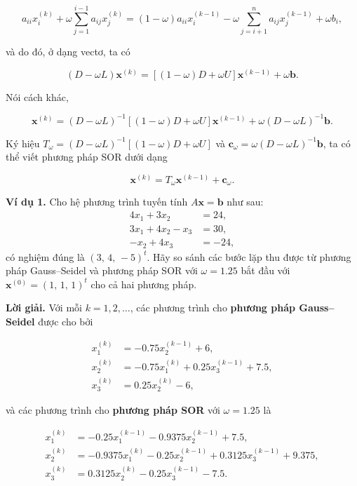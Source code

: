 \[
a_{ii}x_i^{(k)} + \omega \sum_{j=1}^{i-1} a_{ij}x_j^{(k)} 
= (1 - \omega)a_{ii}x_i^{(k-1)} - \omega \sum_{j=i+1}^{n} a_{ij}x_j^{(k-1)} + \omega b_i,
\]

và do đó, ở dạng vectơ, ta có

\[
(D - \omega L)\mathbf{x}^{(k)} = [(1 - \omega)D + \omega U]\mathbf{x}^{(k-1)} + \omega \mathbf{b}.
\]

Nói cách khác,

\[
\mathbf{x}^{(k)} = (D - \omega L)^{-1}[(1 - \omega)D + \omega U]\mathbf{x}^{(k-1)} + \omega (D - \omega L)^{-1}\mathbf{b}. \tag{7.18}
\]

Ký hiệu \( T_\omega = (D - \omega L)^{-1}[(1 - \omega)D + \omega U] \) và 
\( \mathbf{c}_\omega = \omega (D - \omega L)^{-1}\mathbf{b} \), 
ta có thể viết phương pháp SOR dưới dạng

\[
\mathbf{x}^{(k)} = T_\omega \mathbf{x}^{(k-1)} + \mathbf{c}_\omega. \tag{7.19}
\]

\textbf{Ví dụ 1.}  
Cho hệ phương trình tuyến tính \( A\mathbf{x} = \mathbf{b} \) như sau:
\[
\begin{aligned}
4x_1 + 3x_2 &= 24, \\
3x_1 + 4x_2 - x_3 &= 30, \\
- x_2 + 4x_3 &= -24,
\end{aligned}
\]
có nghiệm đúng là \( (3,\, 4,\, -5)^{t} \).
Hãy so sánh các bước lặp thu được từ phương pháp Gauss--Seidel 
và phương pháp SOR với \( \omega = 1.25 \) 
bắt đầu với \( \mathbf{x}^{(0)} = (1,\, 1,\, 1)^{t} \) cho cả hai phương pháp.

\textbf{Lời giải.}  
Với mỗi \( k = 1, 2, \ldots \), các phương trình cho \textbf{phương pháp Gauss--Seidel} được cho bởi

\[
\begin{aligned}
x_1^{(k)} &= -0.75x_2^{(k-1)} + 6, \\
x_2^{(k)} &= -0.75x_1^{(k)} + 0.25x_3^{(k-1)} + 7.5, \\
x_3^{(k)} &= 0.25x_2^{(k)} - 6,
\end{aligned}
\]

và các phương trình cho \textbf{phương pháp SOR} với \( \omega = 1.25 \) là

\[
\begin{aligned}
x_1^{(k)} &= -0.25x_1^{(k-1)} - 0.9375x_2^{(k-1)} + 7.5, \\
x_2^{(k)} &= -0.9375x_1^{(k)} - 0.25x_2^{(k-1)} + 0.3125x_3^{(k-1)} + 9.375, \\
x_3^{(k)} &= 0.3125x_2^{(k)} - 0.25x_3^{(k-1)} - 7.5.
\end{aligned}
\]

